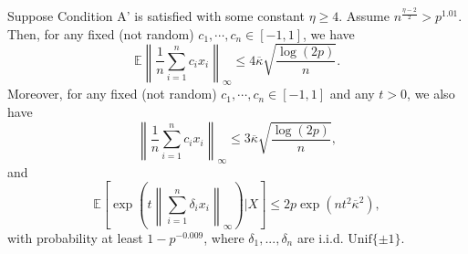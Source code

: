 \begin{lemma}\label{lem:random-heavy}
Suppose Condition A' is satisfied with some constant $\eta\geq 4$. Assume $n^{\frac{\eta-2}{2}}>p^{1.01}$. Then, for any fixed (not random) $c_1,\cdots,c_n\in[-1,1]$, we have
$$\mathbb{E}\left\|\frac{1}{n}\sum_{i=1}^nc_ix_i\right\|_{\infty} \leq 4\overline{\kappa}\sqrt{\frac{\log(2p)}{n}}.$$
Moreover, for any fixed (not random) $c_1,\cdots,c_n\in[-1,1]$ and any $t>0$, we also have
$$\left\|\frac{1}{n}\sum_{i=1}^nc_ix_i\right\|_{\infty}\leq 3\overline{\kappa}\sqrt{\frac{\log(2p)}{n}},$$
and
$$\mathbb{E}\left[\exp\left(t\left\|\sum_{i=1}^n\delta_ix_i\right\|_{\infty}\right)\Bigg|X\right]\leq 2p\exp\left(nt^2\overline{\kappa}^2\right),$$
with probability at least $1-p^{-0.009}$, where $\delta_1,...,\delta_n$ are i.i.d. $\text{Unif}\{\pm 1\}$.
\end{lemma}
